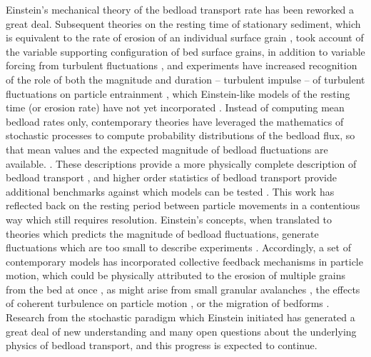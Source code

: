 \documentclass{article}
\begin{document}
Einstein's mechanical theory of the bedload transport rate \citep{Einstein1950} has been reworked a great deal. 
Subsequent theories on the resting time of stationary sediment, which is equivalent to the rate of erosion of an individual surface grain \citep{Yalin1972, Papanicolaou2002, Cheng2004}, took account of the variable supporting configuration of bed surface grains, in addition to variable forcing from turbulent fluctuations \citep{Paintal1971, Wu2002, Dey2018}, and experiments have increased recognition of the role of both the magnitude and duration -- turbulent impulse -- of turbulent fluctuations on particle entrainment \citep{Diplas2008, Valyrakis2010, Celik2014}, which Einstein-like models of the resting time (or erosion rate) have not yet incorporated \citep{Dey2018}. 
Instead of computing mean bedload rates only, contemporary theories have leveraged the mathematics of stochastic processes to compute probability distributions of the bedload flux, so that mean values and the expected magnitude of bedload fluctuations are available. \citep{Lisle1998, Sun2000, Ancey2006, Ancey2008, Ma2014, Ancey2014a}. 
These descriptions provide a more physically complete description of bedload transport \citep{Ancey2008}, and higher order statistics of bedload transport provide additional benchmarks against which models can be tested \citep{Iverson2013}. 
This work has reflected back on the resting period between particle movements in a contentious way which still requires resolution. 
Einstein's concepts, when translated to theories which predicts the magnitude of bedload fluctuations, generate fluctuations which are too small to describe experiments \citep{Ancey2006}. 
Accordingly, a set of contemporary models has incorporated collective feedback mechanisms in particle motion, which could be physically attributed to the erosion of multiple grains from the bed at once \citep{Ancey2008, Heyman2013, Ma2014}, as might arise from small granular avalanches \citep{Heyman2013}, the effects of coherent turbulence on particle motion \citep{Nino1998, Amir2014, Santos2014, Shih2017}, or the migration of bedforms \citep{Dhont2018}. 
Research from the stochastic paradigm which Einstein initiated has generated a great deal of new understanding and many open questions about the underlying physics of bedload transport, and this progress is expected to continue. 
\end{document}
